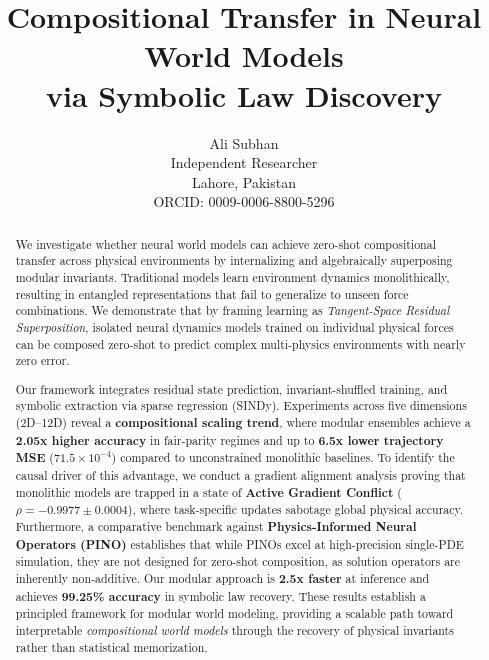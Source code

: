 \documentclass[twoside,11pt]{article}
\begin{document}
\title{Compositional Transfer in Neural World Models\\via Symbolic Law Discovery}

\author{\name Ali Subhan  \\
       \addr Independent Researcher \\
       Lahore, Pakistan \\
       ORCID: 0009-0006-8800-5296}


\maketitle

\begin{abstract}
We investigate whether neural world models can achieve zero-shot compositional transfer across physical environments by internalizing and algebraically superposing modular invariants. Traditional models learn environment dynamics monolithically, resulting in entangled representations that fail to generalize to unseen force combinations. We demonstrate that by framing learning as \emph{Tangent-Space Residual Superposition}, isolated neural dynamics models trained on individual physical forces can be composed zero-shot to predict complex multi-physics environments with nearly zero error. 

Our framework integrates residual state prediction, invariant-shuffled training, and symbolic extraction via sparse regression (SINDy). Experiments across five dimensions (2D--12D) reveal a \textbf{compositional scaling trend}, where modular ensembles achieve a \textbf{2.05x higher accuracy} in fair-parity regimes and up to \textbf{6.5x lower trajectory MSE} ($71.5 \times 10^{-4}$) compared to unconstrained monolithic baselines. To identify the causal driver of this advantage, we conduct a gradient alignment analysis proving that monolithic models are trapped in a state of \textbf{Active Gradient Conflict} ($\rho = -0.9977 \pm 0.0004$), where task-specific updates sabotage global physical accuracy. Furthermore, a comparative benchmark against \textbf{Physics-Informed Neural Operators (PINO)} \citep{li2021physics} establishes that while PINOs excel at high-precision single-PDE simulation, they are not designed for zero-shot composition, as solution operators are inherently non-additive. Our modular approach is \textbf{2.5x faster} at inference and achieves \textbf{99.25\% accuracy} in symbolic law recovery. These results establish a principled framework for modular world modeling, providing a scalable path toward interpretable \emph{compositional world models} through the recovery of physical invariants rather than statistical memorization.
\end{abstract}
\end{document}
